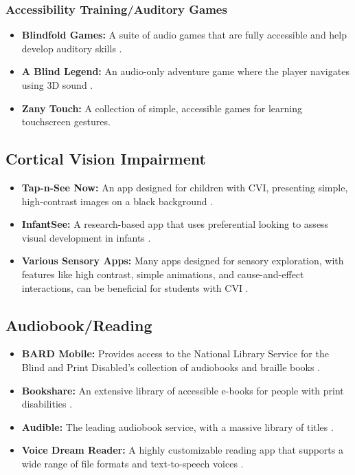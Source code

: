 \subsubsection{Accessibility Training/Auditory Games}\label{ch2:sssec:games}
\begin{itemize}
	\item \textbf{Blindfold Games:} A suite of audio games that are fully accessible and help develop auditory skills \supercite{BlindfoldGames}.
	\item \textbf{A Blind Legend:} An audio-only adventure game where the player navigates using 3D sound \supercite{ABlindLegend}.
	\item \textbf{Zany Touch:} A collection of simple, accessible games for learning touchscreen gestures.\supercite{TapNSeeNow}
\end{itemize}

\subsection{Cortical Vision Impairment}\label{ch2:ssec:cvi-apps}
\begin{itemize}
	\item \textbf{Tap-n-See Now:} An app designed for children with CVI, presenting simple, high-contrast images on a black background \supercite{TapNSeeNow}.
	\item \textbf{InfantSee:} A research-based app that uses preferential looking to assess visual development in infants \supercite{InfantSee}.
	\item \textbf{Various Sensory Apps:} Many apps designed for sensory exploration, with features like high contrast, simple animations, and cause-and-effect interactions, can be beneficial for students with CVI \supercite{SensoryApps}.
\end{itemize}

\subsection{Audiobook/Reading}\label{ch2:ssec:reading-apps}
\begin{itemize}
	\item \textbf{BARD Mobile:} Provides access to the National Library Service for the Blind and Print Disabled's collection of audiobooks and braille books \supercite{BARDMobile}.
	\item \textbf{Bookshare:} An extensive library of accessible e-books for people with print disabilities \supercite{Bookshare}.
	\item \textbf{Audible:} The leading audiobook service, with a massive library of titles \supercite{Audible}.
	\item \textbf{Voice Dream Reader:} A highly customizable reading app that supports a wide range of file formats and text-to-speech voices \supercite{VoiceDreamReader}.
\end{itemize}

